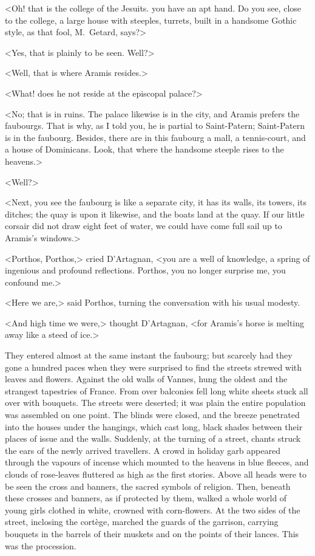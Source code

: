 <Oh! that is the college of the Jesuits.  you have an apt hand. Do you see, close to the college, a large house with steeples, turrets, built in a handsome Gothic style, as that fool, M.~Getard, says?>

<Yes, that is plainly to be seen. Well?>

<Well, that is where Aramis resides.>

<What! does he not reside at the episcopal palace?>

<No; that is in ruins. The palace likewise is in the city, and Aramis prefers the faubourgs. That is why, as I told you, he is partial to Saint-Patern; Saint-Patern is in the faubourg. Besides, there are in this faubourg a mall, a tennis-court, and a house of Dominicans. Look, that where the handsome steeple rises to the heavens.>

<Well?>

<Next, you see the faubourg is like a separate city, it has its walls, its towers, its ditches; the quay is upon it likewise, and the boats land at the quay. If our little corsair did not draw eight feet of water, we could have come full sail up to Aramis's windows.>

<Porthos, Porthos,> cried D'Artagnan, <you are a well of knowledge, a spring of ingenious and profound reflections. Porthos, you no longer surprise me, you confound me.>

<Here we are,> said Porthos, turning the conversation with his usual modesty.

<And high time we were,> thought D'Artagnan, <for Aramis's horse is melting away like a steed of ice.>

They entered almost at the same instant the faubourg; but scarcely had they gone a hundred paces when they were surprised to find the streets strewed with leaves and flowers. Against the old walls of Vannes, hung the oldest and the strangest tapestries of France. From over balconies fell long white sheets stuck all over with bouquets. The streets were deserted; it was plain the entire population was assembled on one point. The blinds were closed, and the breeze penetrated into the houses under the hangings, which cast long, black shades between their places of issue and the walls. Suddenly, at the turning of a street, chants struck the ears of the newly arrived travellers. A crowd in holiday garb appeared through the vapours of incense which mounted to the heavens in blue fleeces, and clouds of rose-leaves fluttered as high as the first stories. Above all heads were to be seen the cross and banners, the sacred symbols of religion. Then, beneath these crosses and banners, as if protected by them, walked a whole world of young girls clothed in white, crowned with corn-flowers. At the two sides of the street, inclosing the cortège, marched the guards of the garrison, carrying bouquets in the barrels of their muskets and on the points of their lances. This was the procession.

